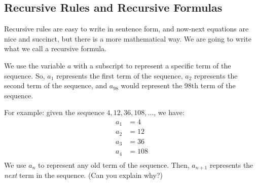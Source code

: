 %
%
%
%

\subsection{Recursive Rules and Recursive Formulas}

Recursive rules are easy to write in sentence form, and now-next equations are nice and succinct, but there is a more mathematical way. We are going to write what we call a recursive formula.
 
We use the variable $a$ with a subscript to represent a specific term of the sequence. So, $a_1$ represents the first term of the sequence, $a_2$ represents the second term of the sequence, and $a_{98}$ would represent the 98th term of the sequence.

For example: given the sequence $4, 12, 36, 108, \dotsc$, we have: \[
\begin{aligned}
a_1 &= 4\\
a_2 &= 12\\
a_3 &= 36\\
a_4 &= 108\\
\end{aligned}\]
We use $a_n$ to represent any old term of the sequence. Then, $a_{n+1}$ represents the \textit{next} term in the sequence. (Can you explain why?)

